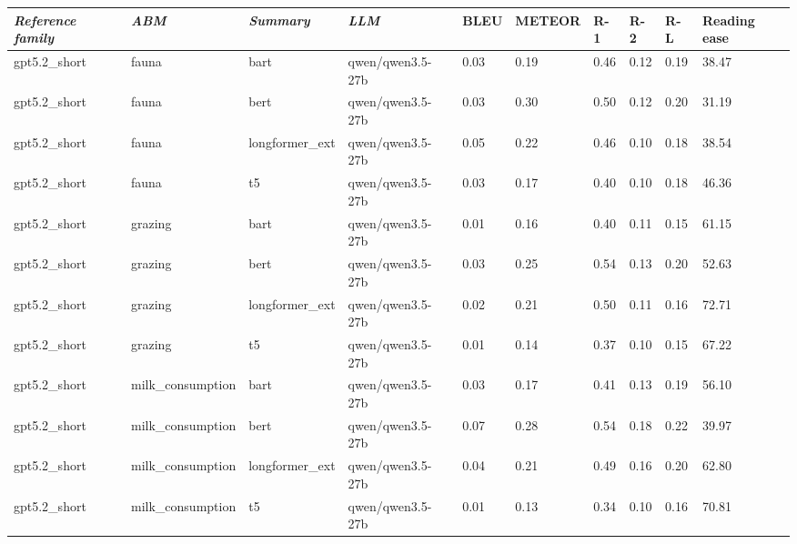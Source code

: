 \begin{tabular}{|l|l|l|l|l|l|l|l|l|l|}
\hline
\textit{\textbf{Reference family}} & \textit{\textbf{ABM}} & \textit{\textbf{Summary}} & \textit{\textbf{LLM}} & BLEU & METEOR & R-1 & R-2 & R-L & Reading ease \\
 \hline
 gpt5.2\_short & fauna & bart & qwen/qwen3.5-27b & 0.03 & 0.19 & 0.46 & 0.12 & 0.19 & 38.47 \\
 \hline
 gpt5.2\_short & fauna & bert & qwen/qwen3.5-27b & 0.03 & 0.30 & 0.50 & 0.12 & 0.20 & 31.19 \\
 \hline
 gpt5.2\_short & fauna & longformer\_ext & qwen/qwen3.5-27b & 0.05 & 0.22 & 0.46 & 0.10 & 0.18 & 38.54 \\
 \hline
 gpt5.2\_short & fauna & t5 & qwen/qwen3.5-27b & 0.03 & 0.17 & 0.40 & 0.10 & 0.18 & 46.36 \\
 \hline
 gpt5.2\_short & grazing & bart & qwen/qwen3.5-27b & 0.01 & 0.16 & 0.40 & 0.11 & 0.15 & 61.15 \\
 \hline
 gpt5.2\_short & grazing & bert & qwen/qwen3.5-27b & 0.03 & 0.25 & 0.54 & 0.13 & 0.20 & 52.63 \\
 \hline
 gpt5.2\_short & grazing & longformer\_ext & qwen/qwen3.5-27b & 0.02 & 0.21 & 0.50 & 0.11 & 0.16 & 72.71 \\
 \hline
 gpt5.2\_short & grazing & t5 & qwen/qwen3.5-27b & 0.01 & 0.14 & 0.37 & 0.10 & 0.15 & 67.22 \\
 \hline
 gpt5.2\_short & milk\_consumption & bart & qwen/qwen3.5-27b & 0.03 & 0.17 & 0.41 & 0.13 & 0.19 & 56.10 \\
 \hline
 gpt5.2\_short & milk\_consumption & bert & qwen/qwen3.5-27b & 0.07 & 0.28 & 0.54 & 0.18 & 0.22 & 39.97 \\
 \hline
 gpt5.2\_short & milk\_consumption & longformer\_ext & qwen/qwen3.5-27b & 0.04 & 0.21 & 0.49 & 0.16 & 0.20 & 62.80 \\
 \hline
 gpt5.2\_short & milk\_consumption & t5 & qwen/qwen3.5-27b & 0.01 & 0.13 & 0.34 & 0.10 & 0.16 & 70.81 \\
\hline
\end{tabular}
